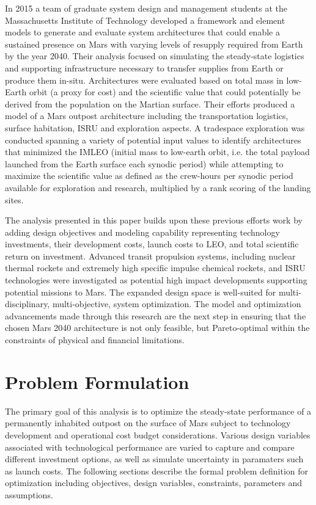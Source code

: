 \documentclass[]{aiaa-pretty}
\begin{document}
In 2015 a team of graduate system design and management students at the Massachusetts Institute of Technology developed a framework and element models to generate and evaluate system architectures that could enable a sustained presence on Mars with varying levels of resupply required from Earth by the year 2040. Their analysis focused on simulating the steady-state logistics and supporting infrastructure necessary to transfer supplies from Earth or produce them in-situ. Architectures were evaluated based on total mass in low-Earth orbit (a proxy for cost) and the scientific value that could potentially be derived from the population on the Martian surface. Their efforts produced a model of a Mars outpost architecture including the transportation logistics, surface habitation, ISRU and exploration aspects. A tradespace exploration was conducted spanning a variety of potential input values to identify architectures that minimized the IMLEO (initial mass to low-earth orbit, i.e. the total payload launched from the Earth surface each synodic period) while attempting to maximize the scientific value as defined as the crew-hours per synodic period available for exploration and research, multiplied by a rank scoring of the landing sites.

The analysis presented in this paper builds upon these previous efforts work by adding design objectives and modeling capability representing technology investments, their development costs, launch costs to LEO, and total scientific return on investment. Advanced transit propulsion systems, including nuclear thermal rockets and extremely high specific impulse chemical rockets, and ISRU technologies were investigated as potential high impact developments supporting potential missions to Mars. The expanded design space is well-suited for multi-disciplinary, multi-objective, system optimization. The model and optimization advancements made through this research are the next step in ensuring that the chosen Mars 2040 architecture is not only feasible, but Pareto-optimal within the constraints of physical and financial limitations. 

\section{Problem Formulation}  
\label{sec:formulation}
The primary goal of this analysis is to optimize the steady-state performance of a permanently inhabited outpost on the surface of Mars subject to technology development and operational cost budget considerations. Various design variables associated with technological performance are varied to capture and compare different investment options, as well as simulate uncertainty in paramaters such as launch costs. The following sections describe the formal problem definition for optimization including objectives, design variables, constraints, parameters and assumptions.
\end{document}
